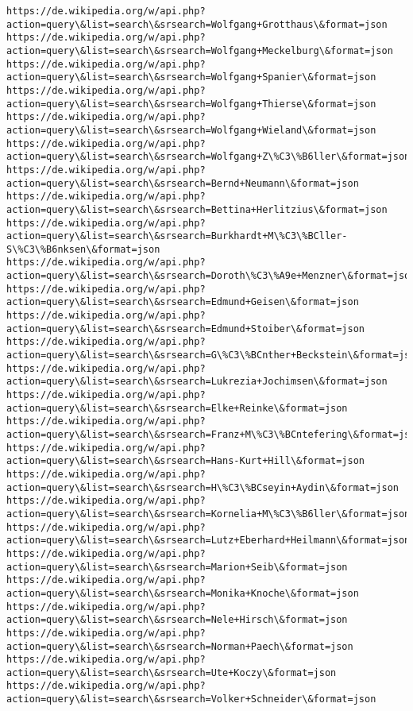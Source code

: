 \documentclass[11pt]{article}
\begin{document}
\begin{Verbatim}[commandchars=\\\{\}]
https://de.wikipedia.org/w/api.php?action=query\&list=search\&srsearch=Wolfgang+Grotthaus\&format=json
https://de.wikipedia.org/w/api.php?action=query\&list=search\&srsearch=Wolfgang+Meckelburg\&format=json
https://de.wikipedia.org/w/api.php?action=query\&list=search\&srsearch=Wolfgang+Spanier\&format=json
https://de.wikipedia.org/w/api.php?action=query\&list=search\&srsearch=Wolfgang+Thierse\&format=json
https://de.wikipedia.org/w/api.php?action=query\&list=search\&srsearch=Wolfgang+Wieland\&format=json
https://de.wikipedia.org/w/api.php?action=query\&list=search\&srsearch=Wolfgang+Z\%C3\%B6ller\&format=json
https://de.wikipedia.org/w/api.php?action=query\&list=search\&srsearch=Bernd+Neumann\&format=json
https://de.wikipedia.org/w/api.php?action=query\&list=search\&srsearch=Bettina+Herlitzius\&format=json
https://de.wikipedia.org/w/api.php?action=query\&list=search\&srsearch=Burkhardt+M\%C3\%BCller-S\%C3\%B6nksen\&format=json
https://de.wikipedia.org/w/api.php?action=query\&list=search\&srsearch=Doroth\%C3\%A9e+Menzner\&format=json
https://de.wikipedia.org/w/api.php?action=query\&list=search\&srsearch=Edmund+Geisen\&format=json
https://de.wikipedia.org/w/api.php?action=query\&list=search\&srsearch=Edmund+Stoiber\&format=json
https://de.wikipedia.org/w/api.php?action=query\&list=search\&srsearch=G\%C3\%BCnther+Beckstein\&format=json
https://de.wikipedia.org/w/api.php?action=query\&list=search\&srsearch=Lukrezia+Jochimsen\&format=json
https://de.wikipedia.org/w/api.php?action=query\&list=search\&srsearch=Elke+Reinke\&format=json
https://de.wikipedia.org/w/api.php?action=query\&list=search\&srsearch=Franz+M\%C3\%BCntefering\&format=json
https://de.wikipedia.org/w/api.php?action=query\&list=search\&srsearch=Hans-Kurt+Hill\&format=json
https://de.wikipedia.org/w/api.php?action=query\&list=search\&srsearch=H\%C3\%BCseyin+Aydin\&format=json
https://de.wikipedia.org/w/api.php?action=query\&list=search\&srsearch=Kornelia+M\%C3\%B6ller\&format=json
https://de.wikipedia.org/w/api.php?action=query\&list=search\&srsearch=Lutz+Eberhard+Heilmann\&format=json
https://de.wikipedia.org/w/api.php?action=query\&list=search\&srsearch=Marion+Seib\&format=json
https://de.wikipedia.org/w/api.php?action=query\&list=search\&srsearch=Monika+Knoche\&format=json
https://de.wikipedia.org/w/api.php?action=query\&list=search\&srsearch=Nele+Hirsch\&format=json
https://de.wikipedia.org/w/api.php?action=query\&list=search\&srsearch=Norman+Paech\&format=json
https://de.wikipedia.org/w/api.php?action=query\&list=search\&srsearch=Ute+Koczy\&format=json
https://de.wikipedia.org/w/api.php?action=query\&list=search\&srsearch=Volker+Schneider\&format=json

\end{Verbatim}
\end{document}
